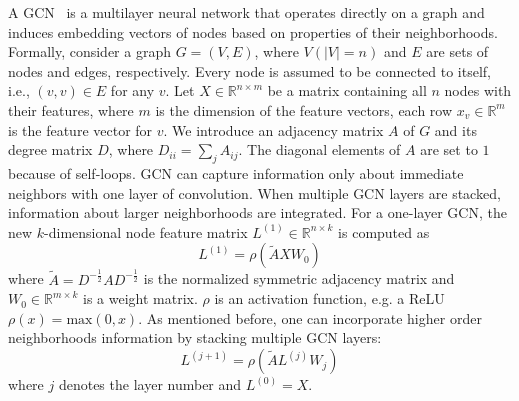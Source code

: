 \documentclass[letterpaper]{article} \usepackage{aaai19}  \usepackage{times}  \usepackage{helvet}  \usepackage{courier}  \usepackage{url}  \usepackage{graphicx}  \frenchspacing  \usepackage{amsmath}
\begin{document}
A GCN~\cite{kipf2017semi} is a multilayer neural network that operates directly on a graph and induces embedding vectors of nodes based on properties of their neighborhoods. Formally, consider a graph $G = (V, E)$, where $V(|V| = n)$ and $E$ are sets of nodes and edges, respectively. Every node is assumed to be connected to itself, i.e., $(v, v) \in E$ for any $v$. Let $X \in \mathbb{R}^{n \times m}$ be a matrix containing all $n$ nodes with their features, where $m$ is the dimension of the feature vectors, each row $x_v \in \mathbb{R}^m$ is the feature vector for $v$. 
We introduce an adjacency matrix $A$ of $G$ and its degree matrix $D$, where $D_{ii} = \sum_j A_{ij}$. The diagonal elements of $A$ are set to $1$ because of self-loops.
GCN can capture information only about immediate neighbors with one layer of convolution. When multiple GCN layers are stacked, information about larger neighborhoods are integrated. For a one-layer GCN, the new $k$-dimensional node feature matrix $L^{(1)} \in \mathbb{R}^{n \times k}$ is computed as
\begin{equation}
L^{(1)} = \rho(\tilde{A}XW_0)
\label{1stl}
\end{equation}
where $\tilde{A} = D^{-\frac{1}{2}}A D^{-\frac{1}{2}}$ is the normalized symmetric adjacency matrix and $W_0 \in \mathbb{R}^{m \times k}$ is a weight matrix. $\rho$ is an activation function, e.g. a ReLU $\rho(x) = \text{max}(0,x)$. As mentioned before, one can incorporate higher order neighborhoods information by stacking multiple GCN layers:
\begin{equation}
L^{(j+1)} = \rho(\tilde{A}L^{(j)}W_j)
\end{equation}
where $j$ denotes the layer number and $L^{(0)} = X$.
\end{document}
